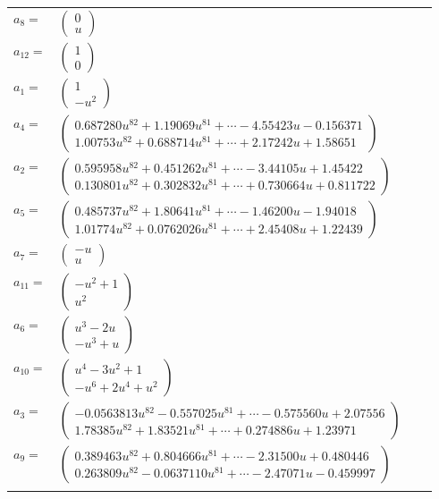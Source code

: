 \documentclass[1p]{elsarticle_modified}
\theoremstyle{definition}
\begin{document}
\begin{tabular}{m{7pt} m{180pt} m{7pt} m{180pt} }
\flushright $a_{8}=$&$\begin{pmatrix}0\\u\end{pmatrix}$ \\
\flushright $a_{12}=$&$\begin{pmatrix}1\\0\end{pmatrix}$ \\
\flushright $a_{1}=$&$\begin{pmatrix}1\\- u^2\end{pmatrix}$ \\
\flushright $a_{4}=$&$\begin{pmatrix}0.687280 u^{82}+1.19069 u^{81}+\cdots-4.55423 u-0.156371\\1.00753 u^{82}+0.688714 u^{81}+\cdots+2.17242 u+1.58651\end{pmatrix}$ \\
\flushright $a_{2}=$&$\begin{pmatrix}0.595958 u^{82}+0.451262 u^{81}+\cdots-3.44105 u+1.45422\\0.130801 u^{82}+0.302832 u^{81}+\cdots+0.730664 u+0.811722\end{pmatrix}$ \\
\flushright $a_{5}=$&$\begin{pmatrix}0.485737 u^{82}+1.80641 u^{81}+\cdots-1.46200 u-1.94018\\1.01774 u^{82}+0.0762026 u^{81}+\cdots+2.45408 u+1.22439\end{pmatrix}$ \\
\flushright $a_{7}=$&$\begin{pmatrix}- u\\u\end{pmatrix}$ \\
\flushright $a_{11}=$&$\begin{pmatrix}- u^2+1\\u^2\end{pmatrix}$ \\
\flushright $a_{6}=$&$\begin{pmatrix}u^3-2 u\\- u^3+u\end{pmatrix}$ \\
\flushright $a_{10}=$&$\begin{pmatrix}u^4-3 u^2+1\\- u^6+2 u^4+u^2\end{pmatrix}$ \\
\flushright $a_{3}=$&$\begin{pmatrix}-0.0563813 u^{82}-0.557025 u^{81}+\cdots-0.575560 u+2.07556\\1.78385 u^{82}+1.83521 u^{81}+\cdots+0.274886 u+1.23971\end{pmatrix}$ \\
\flushright $a_{9}=$&$\begin{pmatrix}0.389463 u^{82}+0.804666 u^{81}+\cdots-2.31500 u+0.480446\\0.263809 u^{82}-0.0637110 u^{81}+\cdots-2.47071 u-0.459997\end{pmatrix}$\\&\end{tabular}
\end{document}
